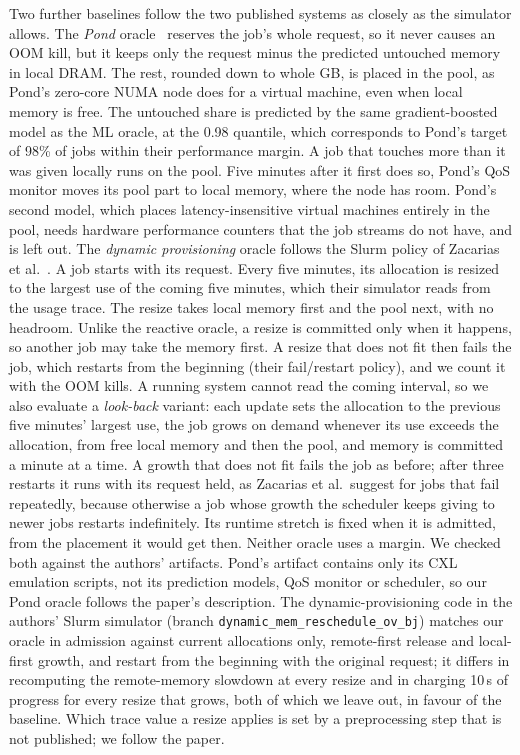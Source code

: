 \documentclass[11pt]{article}
\newcommand{\term}[1]{\emph{#1}}
\begin{document}
Two further baselines follow the two published systems as closely as the simulator allows. The \term{Pond}
oracle~\cite{Li2023Pond} reserves the job's whole request, so it never causes an OOM kill, but it keeps only
the request minus the predicted untouched memory in local DRAM. The rest, rounded down to whole GB, is placed
in the pool, as Pond's zero-core NUMA node does for a virtual machine, even when local memory is free. The
untouched share is predicted by the same gradient-boosted model as the ML oracle, at the 0.98 quantile,
which corresponds to Pond's target of 98\% of jobs within their performance margin. A job that touches more than
it was given locally runs on the pool. Five minutes after it first does so, Pond's QoS monitor moves its pool
part to local memory, where the node has room. Pond's second model, which places latency-insensitive virtual
machines entirely in the pool, needs hardware performance counters that the job streams do not have, and is
left out. The \term{dynamic provisioning} oracle follows the Slurm policy of Zacarias et
al.~\cite{Zacarias2023Dynamic}. A job starts with its request. Every five minutes, its allocation is resized to the
largest use of the coming five minutes, which their simulator reads from the usage trace. The resize takes
local memory first and the pool next, with no headroom. Unlike the reactive oracle, a resize is committed only
when it happens, so another job may take the memory first. A resize that does not fit then fails the job,
which restarts from the beginning (their fail/restart policy), and we count it with the OOM kills. A running
system cannot read the coming interval, so we also evaluate a \term{look-back} variant: each update sets the
allocation to the previous five minutes' largest use, the job grows on demand whenever its use exceeds the
allocation, from free local memory and then the pool, and memory is committed a minute at a time. A growth that
does not fit fails the job as before; after three restarts it runs with its request held, as Zacarias et al.\
suggest for jobs that fail repeatedly, because otherwise a job whose growth the scheduler keeps giving to newer
jobs restarts indefinitely. Its runtime
stretch is fixed when it is admitted, from the placement it would get then. Neither oracle uses a margin.
We checked both against the authors' artifacts. Pond's artifact contains only its CXL emulation scripts, not
its prediction models, QoS monitor or scheduler, so our Pond oracle follows the paper's description. The
dynamic-provisioning code in the authors' Slurm simulator (branch \texttt{dynamic\_mem\_reschedule\_ov\_bj})
matches our oracle in admission against current allocations only, remote-first release and local-first growth, and
restart from the beginning with the original request; it differs in recomputing the remote-memory slowdown at
every resize and in charging 10\,s of progress for every resize that grows, both of which we leave out, in favour
of the baseline. Which trace value a resize applies is set by a preprocessing step that is not published; we
follow the paper.
\end{document}

